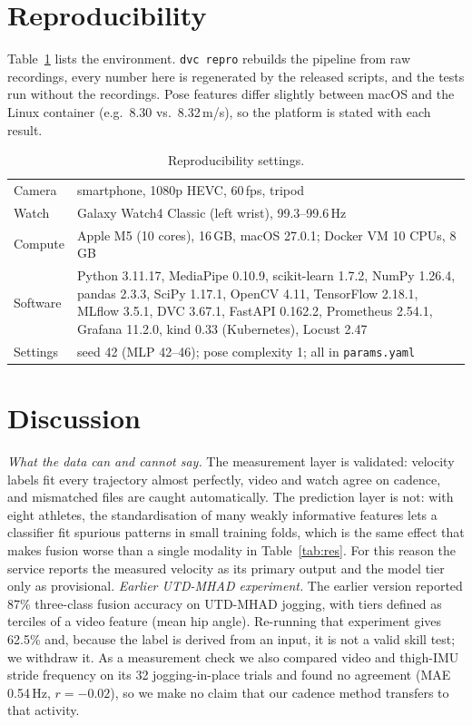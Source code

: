 \documentclass[conference]{IEEEtran}
\begin{document}
\section{Reproducibility}
Table~\ref{tab:repro} lists the environment. \texttt{dvc repro} rebuilds the pipeline from raw recordings, every number here is regenerated by the released scripts, and the tests run without the recordings. Pose features differ slightly between macOS and the Linux container (e.g.\ 8.30 vs.\ 8.32\,m/s), so the platform is stated with each result.
\begin{table}[t]
\caption{Reproducibility settings.}\label{tab:repro}
\centering\small
\setlength{\tabcolsep}{3pt}
\begin{tabular}{@{}lp{}@{}}
\toprule
Camera & smartphone, 1080p HEVC, 60\,fps, tripod\\
Watch & Galaxy Watch4 Classic (left wrist), 99.3--99.6\,Hz\\
Compute & Apple M5 (10 cores), 16\,GB, macOS 27.0.1; Docker VM 10 CPUs, 8\,GB\\
Software & Python 3.11.17, MediaPipe 0.10.9, scikit-learn 1.7.2, NumPy 1.26.4, pandas 2.3.3, SciPy 1.17.1, OpenCV 4.11, TensorFlow 2.18.1, MLflow 3.5.1, DVC 3.67.1, FastAPI 0.162.2, Prometheus 2.54.1, Grafana 11.2.0, kind 0.33 (Kubernetes), Locust 2.47\\
Settings & seed 42 (MLP 42--46); pose complexity 1; all in \texttt{params.yaml}\\
\bottomrule
\end{tabular}
\end{table}

\section{Discussion}
\emph{What the data can and cannot say.} The measurement layer is validated: velocity labels fit every trajectory almost perfectly, video and watch agree on cadence, and mismatched files are caught automatically. The prediction layer is not: with eight athletes, the standardisation of many weakly informative features lets a classifier fit spurious patterns in small training folds, which is the same effect that makes fusion worse than a single modality in Table~\ref{tab:res}. For this reason the service reports the measured velocity as its primary output and the model tier only as provisional.
\emph{Earlier UTD-MHAD experiment.} The earlier version reported 87\% three-class fusion accuracy on UTD-MHAD jogging, with tiers defined as terciles of a video feature (mean hip angle). Re-running that experiment gives 62.5\% and, because the label is derived from an input, it is not a valid skill test; we withdraw it. As a measurement check we also compared video and thigh-IMU stride frequency on its 32 jogging-in-place trials and found no agreement (MAE 0.54\,Hz, $r=-0.02$), so we make no claim that our cadence method transfers to that activity.
\end{document}
